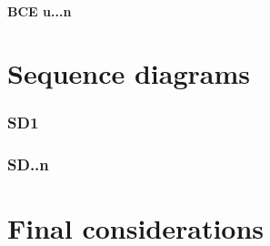 \documentclass[10pt,a4paper,titlepage]{article}
\begin{document}
\subsection{BCE u...n}

\clearpage
\part{Sequence diagrams}
\section{SD1}
\section{SD..n}

\clearpage
\part{Final considerations}

\clearpage
\tableofcontents
\end{document}
